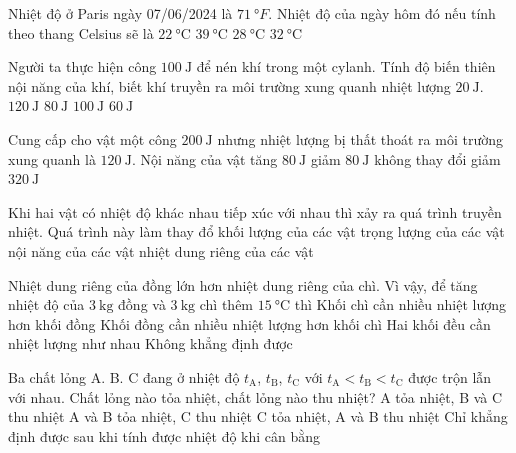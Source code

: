 \begin{ex}
	Nhiệt độ ở Paris ngày 07/06/2024 là $\SI{71}{\degree F}$. Nhiệt độ của ngày hôm đó nếu tính theo thang Celsius sẽ là
	\choice
	{\True $\SI{22}{\celsius}$}
	{$\SI{39}{\celsius}$}
	{$\SI{28}{\celsius}$}
	{$\SI{32}{\celsius}$}
\end{ex}
\begin{ex}
	Người ta thực hiện công $\SI{100}{\joule}$ để nén khí trong một cylanh. Tính độ biến thiên nội năng của khí, biết khí truyền ra môi trường xung quanh nhiệt lượng $\SI{20}{\joule}$.
	\choice
	{$\SI{120}{\joule}$}
	{\True $\SI{80}{\joule}$}
	{$\SI{100}{\joule}$}
	{$\SI{60}{\joule}$}
\end{ex}
\begin{ex}
	Cung cấp cho vật một công $\SI{200}{\joule}$ nhưng nhiệt lượng bị thất thoát ra môi trường xung quanh là $\SI{120}{\joule}$. Nội năng của vật 
	\choice
	{\True tăng $\SI{80}{\joule}$}
	{giảm $\SI{80}{\joule}$}
	{không thay đổi}
	{giảm $\SI{320}{\joule}$}
\end{ex}
\begin{ex}
Khi hai vật có nhiệt độ khác nhau tiếp xúc với nhau thì xảy ra quá trình truyền nhiệt. Quá trình này làm thay đổ	
	\choice
	{khối lượng của các vật}
	{trọng lượng của các vật}
	{\True nội năng của các vật}
	{nhiệt dung riêng của các vật}
	\loigiai{}
\end{ex}
\begin{ex}
Nhiệt dung riêng của đồng lớn hơn nhiệt dung riêng của chì. Vì vậy, để tăng nhiệt độ của $\SI{3}{\kilogram}$ đồng và $\SI{3}{\kilogram}$ chì thêm $\SI{15}{\celsius}$ thì	
	\choice
	{Khối chì cần nhiều nhiệt lượng hơn khối đồng}
	{\True Khối đồng cần nhiều nhiệt lượng hơn khối chì}
	{Hai khối đều cần nhiệt lượng như nhau}
	{Không khẳng định được}
	\loigiai{}
\end{ex}
\begin{ex}
Ba chất lỏng A. B. C đang ở nhiệt độ $t_\text{A}$, $t_\text{B}$, $t_\text{C}$ với $t_\text{A}<t_\text{B}<t_\text{C}$ được trộn lẫn với nhau. Chất lỏng nào tỏa nhiệt, chất lỏng nào thu nhiệt?	
	\choice
	{A tỏa nhiệt, B và C thu nhiệt}
	{A và B tỏa nhiệt, C thu nhiệt}
	{C tỏa nhiệt, A và B thu nhiệt}
	{\True Chỉ khẳng định được sau khi tính được nhiệt độ khi cân bằng}
	\loigiai{}
\end{ex}

